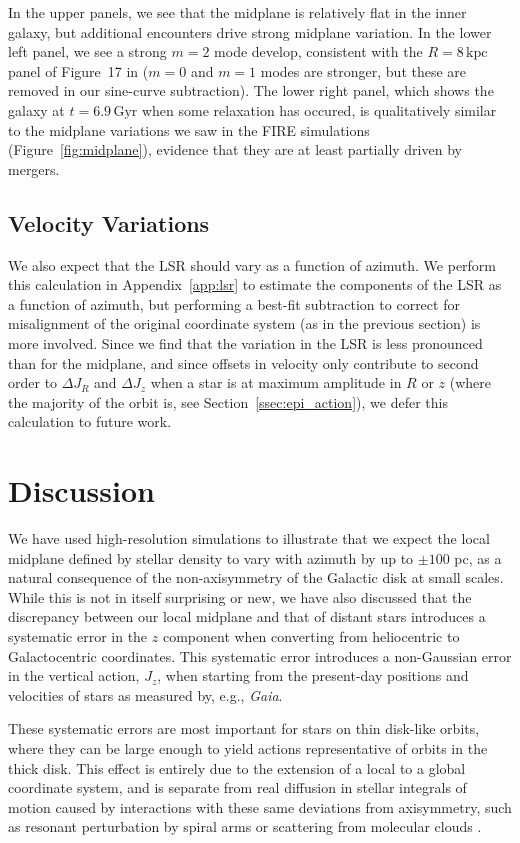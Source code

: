 \documentclass[twocolumn]{aastex62}
\newcommand{\kpc}{\text{kpc}}
\newcommand{\Gyr}{\text{Gyr}}
\begin{document}
In the upper panels, we see that the midplane is relatively flat in the inner
galaxy, but additional encounters drive strong midplane variation. In the
lower left panel, we see a strong $m=2$ mode develop, consistent with the
$R=8\,\kpc$ panel of Figure~17 in \citet{2018MNRAS.481..286L} ($m=0$ and $m=1$ modes are stronger, but these
are removed in our sine-curve subtraction). The lower right
panel, which shows the galaxy at $t=6.9\,\Gyr$ when some relaxation has occured, is
qualitatively similar to the midplane variations we saw in the FIRE
simulations (Figure~\ref{fig:midplane}), evidence that they are at least
partially driven by mergers.

\subsection{Velocity Variations} \label{ssec:lsr_var}
We also expect that the LSR should vary as a function of azimuth. We perform
this calculation in Appendix~\ref{app:lsr} to estimate the components of the
LSR as a function of azimuth, but performing a best-fit subtraction to correct
for misalignment of the original coordinate system (as in the previous
section) is more involved. Since we find that the variation in the LSR is less
pronounced than for the midplane, and since offsets in velocity only
contribute to second order to $\Delta J_R$ and $\Delta J_z$ when a star is at
maximum amplitude in $R$ or $z$ (where the majority of the orbit is, see
Section~\ref{ssec:epi_action}), we defer this calculation to future work.

\section{Discussion} \label{sec:discussion}
We have used high-resolution simulations to illustrate that we expect the
local midplane defined by stellar density to vary with azimuth by up to $\pm
100$ pc, as a natural consequence of the non-axisymmetry of the Galactic disk
at small scales. While this is not in itself surprising or new, we have also
discussed that the discrepancy between our local midplane and that of distant
stars introduces a systematic error in the $z$ component when converting from
heliocentric to Galactocentric coordinates. This systematic error introduces a
non-Gaussian error in the vertical action, $J_z$, when starting from the
present-day positions and velocities of stars as measured by, e.g.,
\textit{Gaia}.

These systematic errors are most important for stars on thin disk-like orbits,
where they can be large enough to yield actions representative of orbits in
the thick disk. This effect is entirely due to the extension of a local to a
global coordinate system, and is separate from real diffusion in stellar
integrals of motion caused by interactions with these same deviations from
axisymmetry, such as resonant perturbation by spiral arms or scattering from
molecular clouds \citep{2014RvMP...86....1S}.
\end{document}
